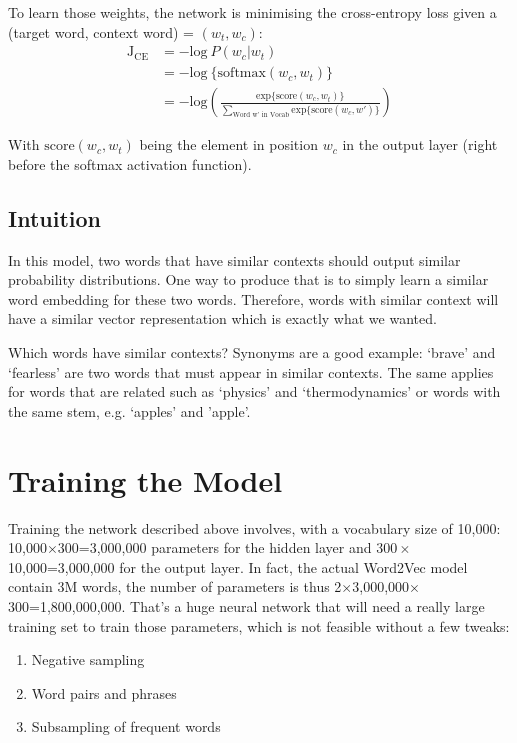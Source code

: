To learn those weights, the network is minimising the cross-entropy loss given a (target word, context word) = $(w_t, w_c)$:
\begin{align}
    \text{J}_{\text{CE}}   &=  -\text{log}~P(w_c | w_t) \nonumber\\
    &= -\text{log}~\{\text{softmax}(w_c, w_t)\}\nonumber\\
    &= -\text{log}\left(\frac{\text{exp}\{\text{score}(w_c, w_t)\}}{\sum_{\text{Word w' in Vocab}}\text{exp}\{\text{score}(w_c, w')\}} \right)
    \label{cross-entropy}
\end{align}

With $\text{score}(w_c, w_t)$ being the element in position $w_c$ in the output layer (right before the softmax activation function).

\subsection{Intuition}
In this model, two words that have similar contexts should output similar probability distributions. One way to produce that is to simply learn a similar word embedding for these two words. Therefore, words with similar context will have a similar vector representation which is exactly what we wanted.

Which words have similar contexts? Synonyms are a good example: `brave' and `fearless' are two words that must appear in similar contexts. The same applies for words that are related such as `physics' and `thermodynamics' or words with the same stem, e.g. `apples' and 'apple'. 

\newpage
\section{Training the Model}
Training the network described above involves, with a vocabulary size of 10,000: 10,000$\times300$=3,000,000 parameters for the hidden layer and $300\times$10,000=3,000,000 for the output layer. In fact, the actual Word2Vec model contain 3M words, the number of parameters is thus 2$\times$3,000,000$\times$300=1,800,000,000. That's a huge neural network that will need a really large training set to train those parameters, which is not feasible without a few tweaks:

\begin{enumerate}
    \item Negative sampling
    \item Word pairs and phrases
    \item Subsampling of frequent words
\end{enumerate}

